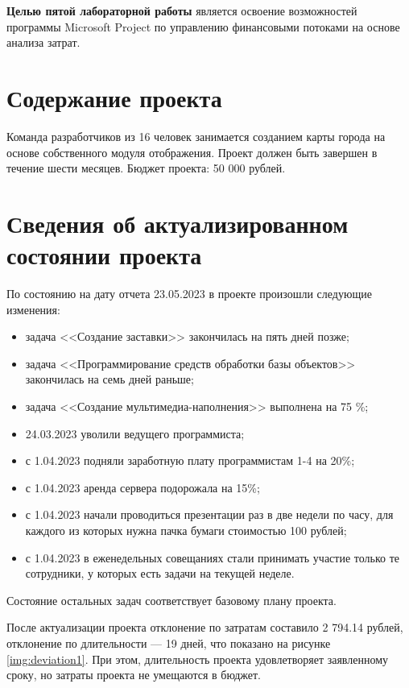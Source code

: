 \textbf{Целью пятой лабораторной работы} является освоение возможностей программы Microsoft Project по управлению финансовыми потоками на основе анализа затрат.

\section*{Содержание проекта}

Команда разработчиков из 16 человек занимается созданием карты города на основе собственного модуля отображения. Проект должен быть завершен в течение шести месяцев. Бюджет проекта: 50 000 рублей.

\section*{Сведения об актуализированном состоянии проекта}

По состоянию на дату отчета 23.05.2023 в проекте произошли следующие изменения:

\begin{itemize}
	\item задача <<Создание заставки>> закончилась на пять дней позже;
	\item задача <<Программирование средств обработки базы объектов>> закончилась на семь дней раньше;
	\item задача <<Создание мультимедиа-наполнения>> выполнена на 75 \%;
	\item 24.03.2023 уволили ведущего программиста;
	\item с 1.04.2023 подняли заработную плату программистам 1-4 на 20\%;
	\item с 1.04.2023 аренда сервера подорожала на 15\%;
	\item с 1.04.2023 начали проводиться презентации раз в две недели по часу, для каждого из которых нужна пачка бумаги стоимостью 100 рублей;
	\item с 1.04.2023 в еженедельных совещаниях стали принимать участие только те сотрудники, у которых есть задачи на текущей неделе.
\end{itemize}

Состояние остальных задач соответствует базовому плану проекта.

После актуализации проекта отклонение по затратам составило 2 794.14 рублей, отклонение по длительности --- 19 дней, что показано на рисунке \ref{img:deviation1}. При этом, длительность проекта удовлетворяет заявленному сроку, но затраты проекта не умещаются в бюджет.

